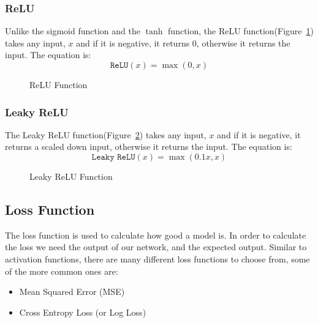 \documentclass[titlepage]{article}
\begin{document}
\subsubsection{ReLU}
Unlike the sigmoid function and the $\tanh$ function, the ReLU function(Figure~\ref{fig:relu}) takes any input, $x$ and if it is negative, it returns 0, otherwise it returns the input. The equation is:
\begin{equation}
    \texttt{ReLU}(x) = \max(0, x)
    \label{eq:relu}
\end{equation}

\begin{figure}[h!]
    \begin{center}
    \end{center}
    \caption{ReLU Function}  
    \label{fig:relu}
\end{figure}

\subsubsection{Leaky ReLU}
The Leaky ReLU function(Figure~\ref{fig:leaky-relu}) takes any input, $x$ and if it is negative, it returns a scaled down input, otherwise it returns the input. The equation is:
\begin{equation}
    \texttt{Leaky ReLU}(x) = \max(0.1x, x)
    \label{eq:leaky-relu}
\end{equation}
\begin{figure}[h!]
    \begin{center}
    \end{center}
    \caption{Leaky ReLU Function}    
    \label{fig:leaky-relu}
\end{figure}

\subsection{Loss Function}
The loss function is used to calculate how good a model is. In order to calculate the loss we need the output of our network, and the expected output\cite{Loss Functions}. Similar to activation functions, there are many different loss functions to choose from, some of the more common ones are:
\begin{itemize}
    \item Mean Squared Error (MSE)
    \item Cross Entropy Loss (or Log Loss)
\end{itemize}
\end{document}
